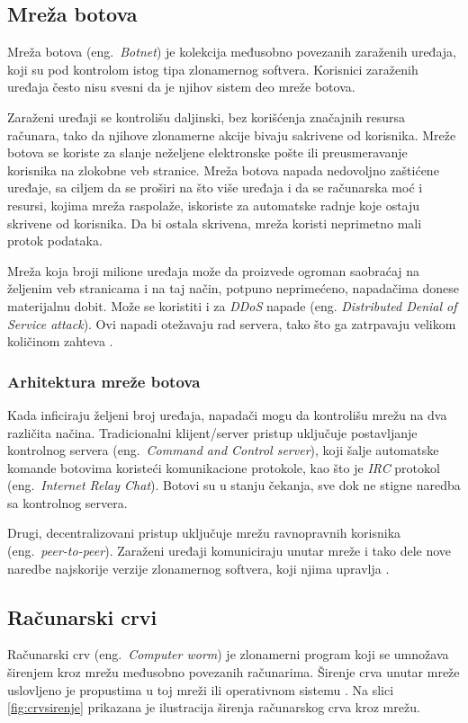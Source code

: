 \documentclass[a4paper]{article}
\begin{document}
\subsection{Mreža botova}
\label{botnet}

Mreža botova (eng.~{\em Botnet}) je kolekcija 
međusobno povezanih zaraženih uređaja, koji su pod kontrolom istog tipa zlonamernog softvera. Korisnici zaraženih uređaja često nisu svesni da je njihov sistem deo mreže botova.

Zaraženi uređaji se kontrolišu daljinski, bez 
korišćenja značajnih resursa računara, tako da njihove zlonamerne akcije bivaju sakrivene od korisnika. Mreže botova se koriste za slanje neželjene elektronske 
pošte ili preusmeravanje korisnika na zlokobne veb 
stranice. Mreža botova napada nedovoljno zaštićene 
uređaje, sa ciljem da se proširi na što više uređaja i da se računarska moć i resursi, kojima mreža 
raspolaže, iskoriste za automatske radnje koje ostaju 
skrivene od korisnika. Da bi ostala skrivena, mreža 
koristi neprimetno mali protok podataka. 

Mreža koja broji milione uređaja može da proizvede ogroman saobraćaj na željenim veb stranicama i na taj način, potpuno neprimećeno, napadačima donese materijalnu dobit. Može se koristiti i za \textit{DDoS} napade (eng. \textit{Distributed Denial of Service attack}). Ovi napadi otežavaju rad servera, tako što ga zatrpavaju velikom količinom zahteva \cite{botnet}.

\subsubsection{Arhitektura mreže botova}

Kada inficiraju željeni broj uređaja, napadači mogu da kontrolišu mrežu na dva različita načina. Tradicionalni klijent/server pristup uključuje postavljanje kontrolnog servera (eng.~{\em Command and Control server}), koji šalje automatske komande botovima koristeći komunikacione protokole, kao što je \textit{IRC} protokol (eng.~{\em Internet Relay Chat}). Botovi su u stanju čekanja, sve dok ne stigne naredba sa kontrolnog servera.

Drugi, decentralizovani pristup uključuje mrežu ravnopravnih korisnika (eng.~{\em peer-to-peer}). Zaraženi uređaji komuniciraju unutar mreže i tako dele nove naredbe najskorije verzije zlonamernog softvera, koji njima upravlja \cite{botnet}.

\subsection{Računarski crvi}
Računarski crv (eng.~{\em Computer worm}) je zlonamerni program koji se umnožava širenjem kroz mrežu međusobno povezanih računarima. Širenje crva unutar mreže uslovljeno je propustima u toj mreži ili operativnom sistemu \cite{norton_worm, ethics}. Na slici \ref{fig:crvsirenje} prikazana je ilustracija širenja računarskog crva kroz mrežu.
\end{document}
